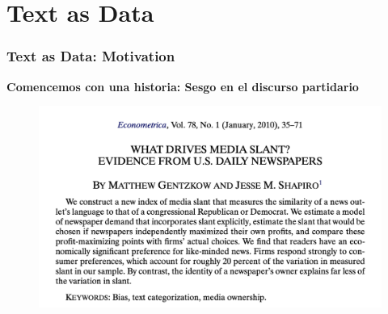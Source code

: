 \documentclass[
  shownotes,
  xcolor={svgnames},
  hyperref={colorlinks,citecolor=DarkBlue,linkcolor=DarkRed,urlcolor=DarkBlue}
  , aspectratio=169]{beamer}
\newcommand{\theme}{\color{andesred}}
\begin{document}
\section{Text as Data}
\begin{frame}[fragile]
\frametitle{Text as Data: Motivation}

{\bf Comencemos con una historia: \theme Sesgo en el discurso partidario}

  \begin{figure}[H] \centering
            \captionsetup{justification=centering}
              \includegraphics[scale=0.5]{figures/gentzgow_shapiro}
              
 \end{figure}

\end{frame}
\end{document}
